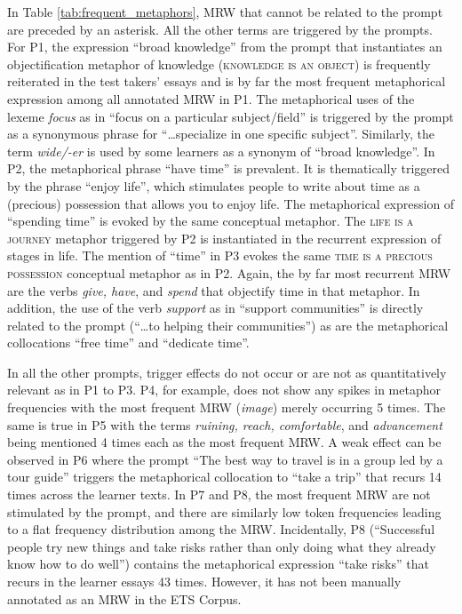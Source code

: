 \documentclass[11pt,a4paper]{article}
\begin{document}
In Table \ref{tab:frequent_metaphors}, MRW that cannot be related to the prompt are preceded by an asterisk. All the other terms are triggered by the prompts. For P1, the expression \enquote{broad knowledge} from the prompt that instantiates an objectification metaphor of knowledge (\textsc{knowledge is an object}) is frequently reiterated in the test takers’ essays and is by far the most frequent metaphorical expression among all annotated MRW in P1. The metaphorical uses of the lexeme \emph{focus} as in \enquote{focus on a particular subject/field} is triggered by the prompt as a synonymous phrase for \enquote{\ldots specialize in one specific subject}. Similarly, the term \emph{wide/-er} is used by some learners as a synonym of \enquote{broad knowledge}. In P2, the metaphorical phrase \enquote{have time} is prevalent. It is thematically triggered by the phrase \enquote{enjoy life}, which stimulates people to write about time as a (precious) possession that allows you to enjoy life. The metaphorical expression of \enquote{spending time} is evoked by the same conceptual metaphor. The \textsc{life is a journey} metaphor triggered by P2 is instantiated in the recurrent expression of stages in life. The mention of \enquote{time} in P3 evokes the same \textsc{time is a precious possession} conceptual metaphor as in P2. Again, the by far most recurrent MRW are the verbs \emph{give, have}, and \emph{spend} that objectify time in that metaphor. In addition, the use of the verb \emph{support} as in \enquote{support communities} is directly related to the prompt (\enquote{\ldots to helping their communities}) as are the metaphorical collocations \enquote{free time} and \enquote{dedicate time}. 

In all the other prompts, trigger effects do not occur or are not as quantitatively relevant as in P1 to P3. P4, for example, does not show any spikes in metaphor frequencies with the most frequent MRW (\emph{image}) merely occurring 5 times. The same is true in P5 with the terms \emph{ruining, reach, comfortable}, and \emph{advancement} being mentioned 4 times each as the most frequent MRW. A weak effect can be observed in P6 where the prompt \enquote{The best way to travel is in a group led by a tour guide} triggers the metaphorical collocation to \enquote{take a trip} that recurs 14 times across the learner texts. In P7 and P8, the most frequent MRW are not stimulated by the prompt, and there are similarly low token frequencies leading to a flat frequency distribution among the MRW. Incidentally, P8 (\enquote{Successful people try new things and take risks rather than only doing what they already know how to do well}) contains the metaphorical expression \enquote{take risks} that recurs in the learner essays 43 times. However, it has not been manually annotated as an MRW in the ETS Corpus.
\end{document}
